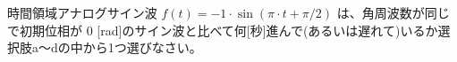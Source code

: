 時間領域アナログサイン波 $f(t) = -1 \cdot \sin( \pi \cdot t + \pi/2 )$ は、角周波数が同じで初期位相が $0$ [rad]のサイン波と比べて何[秒]進んで(あるいは遅れて)いるか選択肢a〜dの中から1つ選びなさい。
